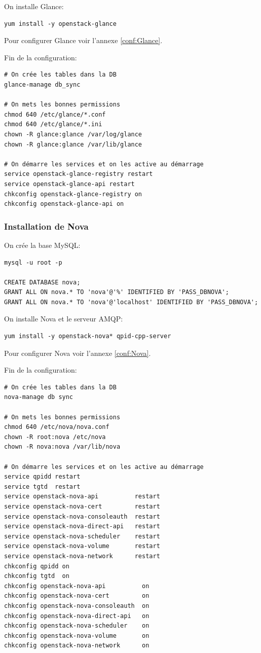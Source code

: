 \documentclass[a4paper,oneside]{report}
\begin{document}
\noindent On installe Glance:
\begin{verbatim}
yum install -y openstack-glance
\end{verbatim}

\noindent Pour configurer Glance voir l'annexe \ref{conf:Glance}.

\noindent Fin de la configuration:
\begin{verbatim}
# On crée les tables dans la DB
glance-manage db_sync

# On mets les bonnes permissions
chmod 640 /etc/glance/*.conf
chmod 640 /etc/glance/*.ini
chown -R glance:glance /var/log/glance
chown -R glance:glance /var/lib/glance

# On démarre les services et on les active au démarrage
service openstack-glance-registry restart
service openstack-glance-api restart
chkconfig openstack-glance-registry on
chkconfig openstack-glance-api on
\end{verbatim}

\subsubsection{Installation de Nova}
\noindent On crée la base MySQL:
\begin{verbatim}
mysql -u root -p

CREATE DATABASE nova;
GRANT ALL ON nova.* TO 'nova'@'%' IDENTIFIED BY 'PASS_DBNOVA';
GRANT ALL ON nova.* TO 'nova'@'localhost' IDENTIFIED BY 'PASS_DBNOVA';
\end{verbatim}

\noindent On installe Nova et le serveur AMQP:
\begin{verbatim}
yum install -y openstack-nova* qpid-cpp-server
\end{verbatim}

\noindent Pour configurer Nova voir l'annexe \ref{conf:Nova}.

\noindent Fin de la configuration:
\begin{verbatim}
# On crée les tables dans la DB
nova-manage db sync

# On mets les bonnes permissions
chmod 640 /etc/nova/nova.conf
chown -R root:nova /etc/nova
chown -R nova:nova /var/lib/nova

# On démarre les services et on les active au démarrage
service qpidd restart
service tgtd  restart
service openstack-nova-api          restart
service openstack-nova-cert         restart
service openstack-nova-consoleauth  restart
service openstack-nova-direct-api   restart
service openstack-nova-scheduler    restart
service openstack-nova-volume       restart
service openstack-nova-network      restart
chkconfig qpidd on
chkconfig tgtd  on
chkconfig openstack-nova-api          on
chkconfig openstack-nova-cert         on
chkconfig openstack-nova-consoleauth  on
chkconfig openstack-nova-direct-api   on
chkconfig openstack-nova-scheduler    on
chkconfig openstack-nova-volume       on
chkconfig openstack-nova-network      on
\end{verbatim}
\end{document}
